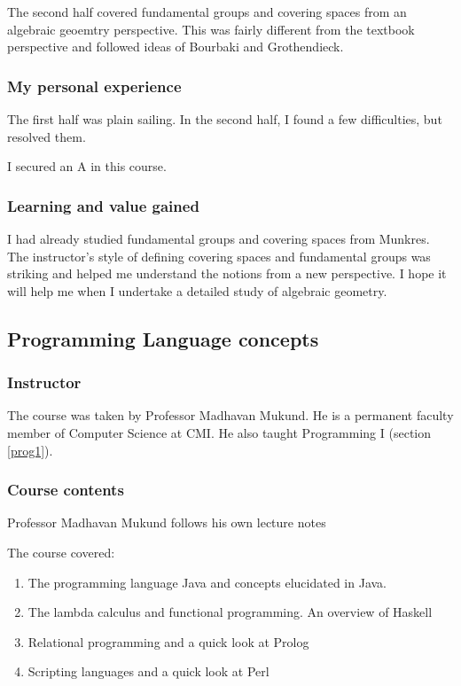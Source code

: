 \documentclass[a4paper]{amsart}
\begin{document}
The second half covered fundamental groups and covering spaces from an
algebraic geoemtry perspective.  This was fairly different from the
textbook perspective and followed ideas of Bourbaki and Grothendieck.

\subsubsection{My personal experience}

The first half was plain sailing. In the second half, I found a few
difficulties, but resolved them.

I secured an A in this course.

\subsubsection{Learning and value gained}

I had already studied fundamental groups and covering spaces from
Munkres.  The instructor's style of defining covering spaces and
fundamental groups was striking and helped me understand the notions
from a new perspective. I hope it will help me when I undertake a
detailed study of algebraic geometry.

\subsection{Programming Language concepts}

\subsubsection{Instructor}

The course was taken by Professor Madhavan Mukund. He is a permanent faculty member of Computer Science at CMI.
He also taught Programming I (section \ref{prog1}).

\subsubsection{Course contents}

Professor Madhavan Mukund follows his own lecture notes %

The course covered:

\begin{enumerate}

\item The programming language Java and concepts elucidated in Java.

\item The lambda calculus and functional programming. An overview of Haskell

\item Relational programming and a quick look at Prolog

\item Scripting languages and a quick look at Perl

\end{enumerate}
\end{document}
